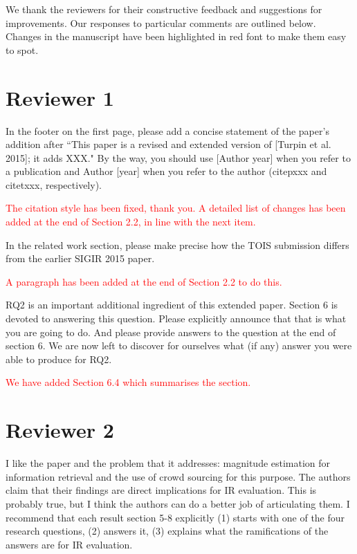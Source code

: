\documentclass[a4paper]{article}
\newcommand{\comment}[1]{\vspace{1em} \textcolor{red}{{#1}} \vspace{1em}}
\begin{document}
We thank the reviewers for their constructive feedback and suggestions
for improvements.
Our responses to particular comments are outlined below.
Changes in the manuscript have been highlighted in red font to make
them easy to spot.


\section{Reviewer 1}

In the footer on the first page, please add a concise statement of
the paper's addition after ``This paper is a revised and extended
version of [Turpin et al. 2015]; it adds XXX." By the way, you
should use [Author year] when you refer to a publication and Author
[year] when you refer to the author (citep{xxx} and citet{xxx},
respectively).

\comment{The citation style has been fixed, thank you. A detailed list of changes has
been added at the end of  Section 2.2, in line with the next
item.}

In the related work section, please make precise how the TOIS
submission differs from the earlier SIGIR 2015 paper.

\comment{A paragraph has been added at the end of Section 2.2 to do this.}

RQ2 is an important additional ingredient of this extended paper.
Section 6 is devoted to answering this question. Please explicitly
announce that that is what you are going to do. And please provide
answers to the question at the end of section 6. We are now left
to discover for ourselves what (if any) answer you were able to
produce for RQ2.

\comment{We have added Section 6.4 which summarises the section.}



\section{Reviewer 2}

I like the paper and the problem that it addresses: magnitude
estimation for information retrieval and the use of crowd sourcing
for this purpose. The authors claim that their findings are direct
implications for IR evaluation. This is probably true, but I think
the authors can do a better job of articulating them. I recommend
that each result section 5-8 explicitly (1) starts with one of the
four research questions, (2) answers it, (3) explains what the
ramifications of the answers are for IR evaluation.
\end{document}
